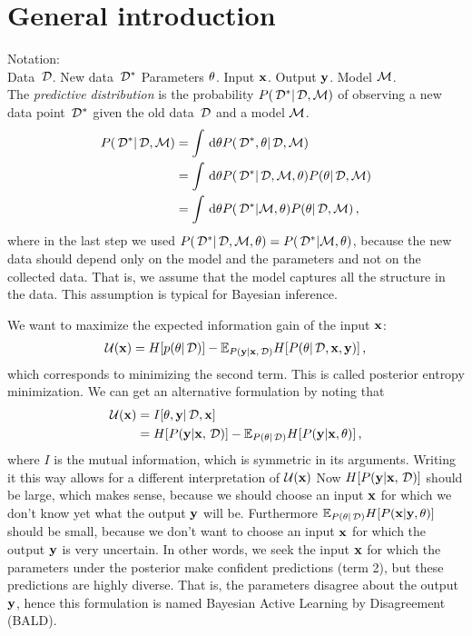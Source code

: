 
\section*{General introduction} %
\label{sec:general_introduction}
Notation: \\
Data $\,\mathcal{D}$. New data $\,\mathcal{D}^*$ Parameters $\theta$. Input ${\bf x}$. Output ${\bf y}$. Model $\mathcal{M}$. \\

The \emph{predictive distribution} is the probability ${P(\,\mathcal{D}^* | \,\mathcal{D}, \mathcal{M})}$ of observing a new data point $\,\mathcal{D}^*$ given the old data $\,\mathcal{D}$ and a model $\mathcal{M}$.
\begin{align*}
	{P(\,\mathcal{D}^* | \,\mathcal{D}, \mathcal{M})}
	&= \int \,\mathrm{d} \theta
		{P(\,\mathcal{D}^*, \theta| \,\mathcal{D}, \mathcal{M})} \\
	&= \int \,\mathrm{d} \theta
		{P(\,\mathcal{D}^* | \,\mathcal{D}, \mathcal{M}, \theta)}
		{P(\theta| \,\mathcal{D}, \mathcal{M})} \\
	&= \int \,\mathrm{d} \theta
		{P(\,\mathcal{D}^* | \mathcal{M}, \theta)}
		{P(\theta| \,\mathcal{D}, \mathcal{M})} \,,
\end{align*}
where in the last step we used ${P(\,\mathcal{D}^* | \,\mathcal{D}, \mathcal{M}, \theta)} = {P(\,\mathcal{D}^* | \mathcal{M}, \theta)}$, because the new data should depend only on the model and the parameters and not on the collected data. That is, we assume that the model captures all the structure in the data. This assumption is typical for Bayesian inference.

We want to maximize the expected information gain of the input ${\bf x}$:
\begin{align}
	\mathcal{U}({\bf x})
	= H[p(\theta | \,\mathcal{D})]
	- \mathbb{E}_{{P({\bf y} | {\bf x}, \,\mathcal{D})}} H[{P(\theta | \,\mathcal{D}, {\bf x}, {\bf y})}] \,,
\end{align}
which corresponds to minimizing the second term. This is called posterior entropy minimization.
We can get an alternative formulation by noting that
\begin{align}
	\mathcal{U}({\bf x})
	&= I[\theta, {\bf y} | \,\mathcal{D}, {\bf x}] \\
	&= H[{P({\bf y} | {\bf x}, \,\mathcal{D})}]
	- \mathbb{E}_{{P(\theta | \,\mathcal{D})}} H[{P({\bf y} | {\bf x}, \theta)}] \,,
\end{align}
where $I$ is the mutual information, which is symmetric in its arguments. Writing it this way allows for a different interpretation of $\mathcal{U}({\bf x})$
Now $H[{P({\bf y} | {\bf x}, \,\mathcal{D})}]$ should be large, which makes sense, because we should choose an input ${\bf x}$ for which we don't know yet what the output ${\bf y}$ will be. Furthermore $\mathbb{E}_{{P(\theta | \,\mathcal{D})}} H[{P({\bf x} | {\bf y}, \theta)}]$ should be small, because we don't want to choose an input ${\bf x}$ for which the output ${\bf y}$ is very uncertain.
In other words, we seek the input ${\bf x}$ for which the parameters under the posterior make confident predictions (term 2), but these predictions are highly diverse. That is, the parameters disagree about the output ${\bf y}$, hence this formulation is named Bayesian Active Learning by Disagreement (BALD).
